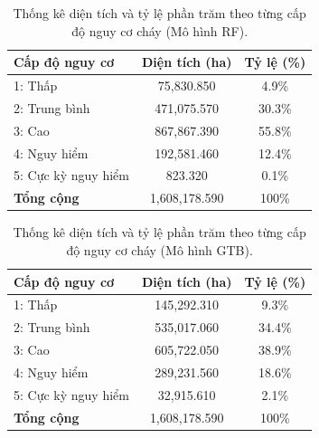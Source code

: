 \documentclass{article}
\begin{document}
\begin{table}[H] %
\centering
\caption{Thống kê diện tích và tỷ lệ phần trăm theo từng cấp độ nguy cơ cháy (Mô hình RF).}
\label{tab:thong_ke_dien_tich_nguy_co_rf}
\begin{tabular}{lcc}
\toprule
\textbf{Cấp độ nguy cơ} & \textbf{Diện tích (ha)} & \textbf{Tỷ lệ (\%)} \\ %
\midrule
1: Thấp & 75,830.850 & 4.9\% \\
2: Trung bình & 471,075.570 & 30.3\% \\
3: Cao & 867,867.390 & 55.8\% \\
4: Nguy hiểm & 192,581.460 & 12.4\% \\
5: Cực kỳ nguy hiểm & 823.320 & 0.1\% \\
\midrule
\textbf{Tổng cộng} & 1,608,178.590 & 100\% \\ %
\bottomrule
\end{tabular}
\end{table}
\FloatBarrier

\begin{table}[H] %
\centering
\caption{Thống kê diện tích và tỷ lệ phần trăm theo từng cấp độ nguy cơ cháy (Mô hình GTB).}
\label{tab:thong_ke_dien_tich_nguy_co_gtb}
\begin{tabular}{lcc}
\toprule
\textbf{Cấp độ nguy cơ} & \textbf{Diện tích (ha)} & \textbf{Tỷ lệ (\%)} \\
\midrule
1: Thấp & 145,292.310 & 9.3\% \\
2: Trung bình & 535,017.060 & 34.4\% \\
3: Cao & 605,722.050 & 38.9\% \\
4: Nguy hiểm & 289,231.560 & 18.6\% \\
5: Cực kỳ nguy hiểm & 32,915.610 & 2.1\% \\
\midrule
\textbf{Tổng cộng} & 1,608,178.590 & 100\% \\ %
\bottomrule
\end{tabular}
\end{table}
\FloatBarrier
\end{document}
